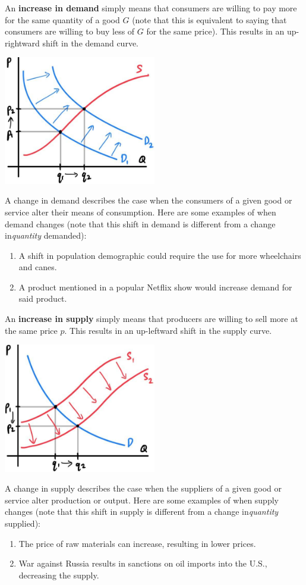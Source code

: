 \documentclass{article}
\begin{document}
    An \textbf{increase in demand} simply means that consumers are willing to pay more for the same quantity of a good $G$ (note that this is equivalent to saying that consumers are willing to buy less of $G$ for the same price). This results in an up-rightward shift in the demand curve.
    \begin{center}
      \includegraphics[width=0.5\textwidth]{img/Increase_in_Demand.jpg}
    \end{center}
    A change in demand describes the case when the consumers of a given good or service alter their means of consumption. Here are some examples of when demand changes (note that this shift in demand is different from a change in\textit{quantity} demanded):
    \begin{enumerate}
    \item A shift in population demographic could require the use for more wheelchairs and canes.
    \item A product mentioned in a popular Netflix show would increase demand for said product.
    \end{enumerate}
    An \textbf{increase in supply} simply means that producers are willing to sell more at the same price $p$. This results in an up-leftward shift in the supply curve.
    \begin{center}
      \includegraphics[width=0.5\textwidth]{img/Increase_in_Supply.jpg}
    \end{center}
    A change in supply describes the case when the suppliers of a given good or service alter production or output. Here are some examples of when supply changes (note that this shift in supply is different from a change in\textit{quantity} supplied):
    \begin{enumerate}
    \item The price of raw materials can increase, resulting in lower prices.
    \item War against Russia results in sanctions on oil imports into the U.S., decreasing the supply.
    \end{enumerate}
\end{document}
